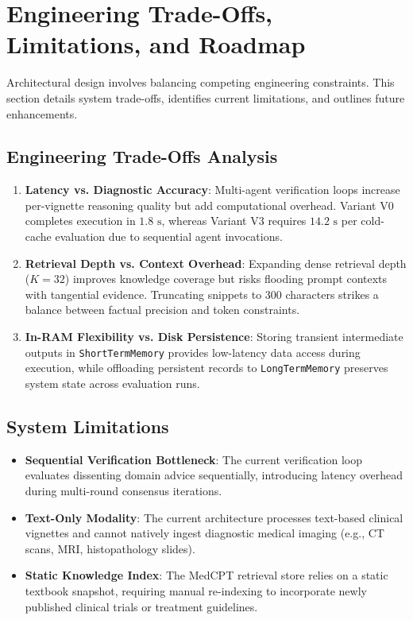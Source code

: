 \section{Engineering Trade-Offs, Limitations, and Roadmap}
\label{sec:tradeoffs_and_future}

Architectural design involves balancing competing engineering constraints. This section details system trade-offs, identifies current limitations, and outlines future enhancements.

\subsection{Engineering Trade-Offs Analysis}

\begin{enumerate}
    \item \textbf{Latency vs. Diagnostic Accuracy}: Multi-agent verification loops increase per-vignette reasoning quality but add computational overhead. Variant V0 completes execution in $1.8\text{ s}$, whereas Variant V3 requires $14.2\text{ s}$ per cold-cache evaluation due to sequential agent invocations.
    \item \textbf{Retrieval Depth vs. Context Overhead}: Expanding dense retrieval depth ($K=32$) improves knowledge coverage but risks flooding prompt contexts with tangential evidence. Truncating snippets to 300 characters strikes a balance between factual precision and token constraints.
    \item \textbf{In-RAM Flexibility vs. Disk Persistence}: Storing transient intermediate outputs in \texttt{ShortTermMemory} provides low-latency data access during execution, while offloading persistent records to \texttt{LongTermMemory} preserves system state across evaluation runs.
\end{enumerate}

\subsection{System Limitations}

\begin{itemize}
    \item \textbf{Sequential Verification Bottleneck}: The current verification loop evaluates dissenting domain advice sequentially, introducing latency overhead during multi-round consensus iterations.
    \item \textbf{Text-Only Modality}: The current architecture processes text-based clinical vignettes and cannot natively ingest diagnostic medical imaging (e.g., CT scans, MRI, histopathology slides).
    \item \textbf{Static Knowledge Index}: The MedCPT retrieval store relies on a static textbook snapshot, requiring manual re-indexing to incorporate newly published clinical trials or treatment guidelines.
\end{itemize}

